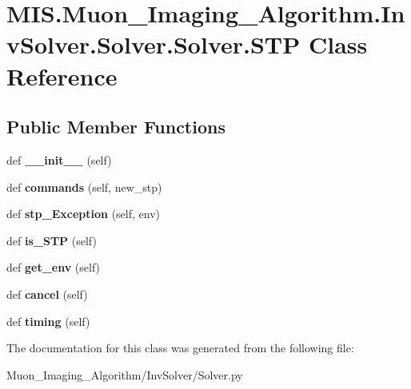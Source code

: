 \hypertarget{classMIS_1_1Muon__Imaging__Algorithm_1_1InvSolver_1_1Solver_1_1Solver_1_1STP}{}\section{M\+I\+S.\+Muon\+\_\+\+Imaging\+\_\+\+Algorithm.\+Inv\+Solver.\+Solver.\+Solver.\+S\+TP Class Reference}
\label{classMIS_1_1Muon__Imaging__Algorithm_1_1InvSolver_1_1Solver_1_1Solver_1_1STP}
\subsection*{Public Member Functions}
\begin{DoxyCompactItemize}
\item 
\mbox{\label{classMIS_1_1Muon__Imaging__Algorithm_1_1InvSolver_1_1Solver_1_1Solver_1_1STP_a75a12b1706bdaf1d5f95752bd220b794}} 
def {\bfseries \+\_\+\+\_\+init\+\_\+\+\_\+} (self)
\item 
\mbox{\label{classMIS_1_1Muon__Imaging__Algorithm_1_1InvSolver_1_1Solver_1_1Solver_1_1STP_a497a715a156379c24dd07a3d705d6269}} 
def {\bfseries commands} (self, new\+\_\+stp)
\item 
\mbox{\label{classMIS_1_1Muon__Imaging__Algorithm_1_1InvSolver_1_1Solver_1_1Solver_1_1STP_accd31ab34bb234e42b89b9ce35a5bb41}} 
def {\bfseries stp\+\_\+\+Exception} (self, env)
\item 
\mbox{\label{classMIS_1_1Muon__Imaging__Algorithm_1_1InvSolver_1_1Solver_1_1Solver_1_1STP_a96c3151b07d542e6a81894ed69ffe4d6}} 
def {\bfseries is\+\_\+\+S\+TP} (self)
\item 
\mbox{\label{classMIS_1_1Muon__Imaging__Algorithm_1_1InvSolver_1_1Solver_1_1Solver_1_1STP_a6513b7b2fbfde0c2b707f903ff94e480}} 
def {\bfseries get\+\_\+env} (self)
\item 
\mbox{\label{classMIS_1_1Muon__Imaging__Algorithm_1_1InvSolver_1_1Solver_1_1Solver_1_1STP_a1bbf2a52c36dfd4f43dfe6497e04b08b}} 
def {\bfseries cancel} (self)
\item 
\mbox{\label{classMIS_1_1Muon__Imaging__Algorithm_1_1InvSolver_1_1Solver_1_1Solver_1_1STP_a0ad0a449de017df26087775f1ed29c24}} 
def {\bfseries timing} (self)
\end{DoxyCompactItemize}


The documentation for this class was generated from the following file\+:\begin{DoxyCompactItemize}
\item 
Muon\+\_\+\+Imaging\+\_\+\+Algorithm/\+Inv\+Solver/Solver.\+py\end{DoxyCompactItemize}
